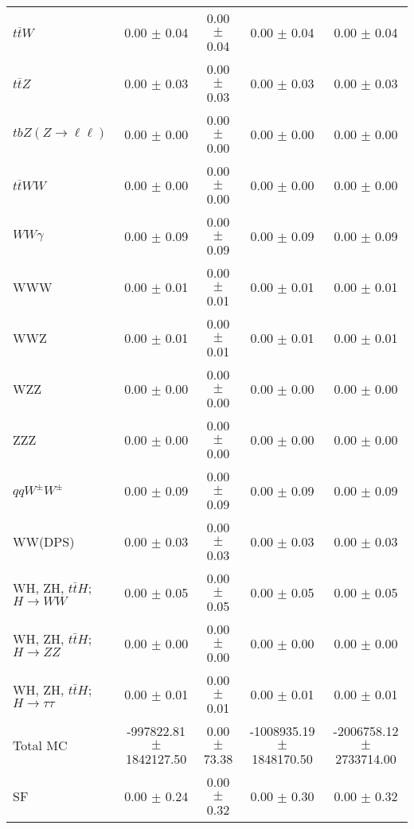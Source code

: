 \begin{tabular}{l|cccc}
                   $t\overline{t}W$ &  0.00 $\pm$  0.04 &  0.00 $\pm$  0.04 &  0.00 $\pm$  0.04 &  0.00 $\pm$  0.04 \\
                   $t\overline{t}Z$ &  0.00 $\pm$  0.03 &  0.00 $\pm$  0.03 &  0.00 $\pm$  0.03 &  0.00 $\pm$  0.03 \\
    $tbZ (Z \rightarrow \ell \ell)$ &  0.00 $\pm$  0.00 &  0.00 $\pm$  0.00 &  0.00 $\pm$  0.00 &  0.00 $\pm$  0.00 \\
                  $t\overline{t}WW$ &  0.00 $\pm$  0.00 &  0.00 $\pm$  0.00 &  0.00 $\pm$  0.00 &  0.00 $\pm$  0.00 \\
                         $WW\gamma$ &  0.00 $\pm$  0.09 &  0.00 $\pm$  0.09 &  0.00 $\pm$  0.09 &  0.00 $\pm$  0.09 \\
                                WWW &  0.00 $\pm$  0.01 &  0.00 $\pm$  0.01 &  0.00 $\pm$  0.01 &  0.00 $\pm$  0.01 \\
                                WWZ &  0.00 $\pm$  0.01 &  0.00 $\pm$  0.01 &  0.00 $\pm$  0.01 &  0.00 $\pm$  0.01 \\
                                WZZ &  0.00 $\pm$  0.00 &  0.00 $\pm$  0.00 &  0.00 $\pm$  0.00 &  0.00 $\pm$  0.00 \\
                                ZZZ &  0.00 $\pm$  0.00 &  0.00 $\pm$  0.00 &  0.00 $\pm$  0.00 &  0.00 $\pm$  0.00 \\
                 $qqW^{\pm}W^{\pm}$ &  0.00 $\pm$  0.09 &  0.00 $\pm$  0.09 &  0.00 $\pm$  0.09 &  0.00 $\pm$  0.09 \\
                            WW(DPS) &  0.00 $\pm$  0.03 &  0.00 $\pm$  0.03 &  0.00 $\pm$  0.03 &  0.00 $\pm$  0.03 \\
WH, ZH, $t\bar{t}H$; $H \rightarrow WW$ &  0.00 $\pm$  0.05 &  0.00 $\pm$  0.05 &  0.00 $\pm$  0.05 &  0.00 $\pm$  0.05 \\
WH, ZH, $t\bar{t}H$; $H \rightarrow ZZ$ &  0.00 $\pm$  0.00 &  0.00 $\pm$  0.00 &  0.00 $\pm$  0.00 &  0.00 $\pm$  0.00 \\
WH, ZH, $t\bar{t}H$; $H \rightarrow \tau\tau$ &  0.00 $\pm$  0.01 &  0.00 $\pm$  0.01 &  0.00 $\pm$  0.01 &  0.00 $\pm$  0.01 \\
\hline\hline
                           Total MC & -997822.81 $\pm$ 1842127.50 &  0.00 $\pm$ 73.38 & -1008935.19 $\pm$ 1848170.50 & -2006758.12 $\pm$ 2733714.00 \\
\hline
                                 SF &  0.00 $\pm$  0.24 &  0.00 $\pm$  0.32 &  0.00 $\pm$  0.30 &  0.00 $\pm$  0.32 \\

\end{tabular}
